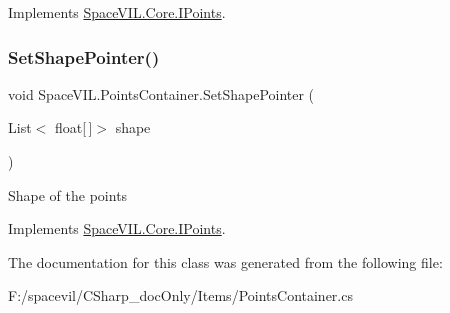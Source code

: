 Implements \mbox{\hyperlink{interface_space_v_i_l_1_1_core_1_1_i_points}{Space\+V\+I\+L.\+Core.\+I\+Points}}.

\mbox{\label{class_space_v_i_l_1_1_points_container_a0694fefae0c13a4006608adc71c9f706}} 
\subsubsection{\texorpdfstring{Set\+Shape\+Pointer()}{SetShapePointer()}}
{\footnotesize\ttfamily void Space\+V\+I\+L.\+Points\+Container.\+Set\+Shape\+Pointer (\begin{DoxyParamCaption}\item[{List$<$ float\mbox{[}$\,$\mbox{]}$>$}]{shape }\end{DoxyParamCaption})}



Shape of the points 



Implements \mbox{\hyperlink{interface_space_v_i_l_1_1_core_1_1_i_points}{Space\+V\+I\+L.\+Core.\+I\+Points}}.



The documentation for this class was generated from the following file\+:\begin{DoxyCompactItemize}
\item 
F\+:/spacevil/\+C\+Sharp\+\_\+doc\+Only/\+Items/Points\+Container.\+cs\end{DoxyCompactItemize}
